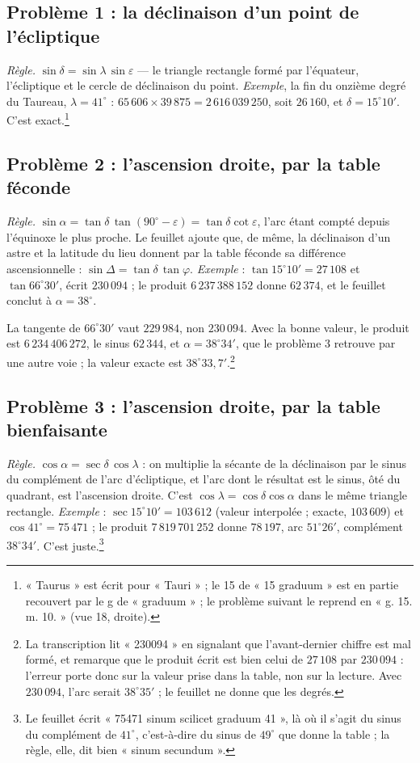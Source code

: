 \documentclass[11pt,a4paper]{article}
\begin{document}
\subsection*{Problème 1 : la déclinaison d'un point de l'écliptique}

\emph{Règle.} $\sin\delta = \sin\lambda\,\sin\varepsilon$ — le triangle rectangle
formé par l'équateur, l'écliptique et le cercle de déclinaison du point.
\emph{Exemple}, la fin du onzième degré du Taureau, $\lambda = 41^\circ$ :
$65\,606 \times 39\,875 = 2\,616\,039\,250$, soit $26\,160$, et $\delta =
15^\circ 10'$. C'est exact.\footnote{« Taurus » est écrit pour « Tauri » ; le 15 de
« 15 graduum » est en partie recouvert par le g de « graduum » ; le problème
suivant le reprend en « g. 15. m. 10. » (vue 18, droite).}

\subsection*{Problème 2 : l'ascension droite, par la table féconde}

\emph{Règle.} $\sin\alpha = \tan\delta\,\tan(90^\circ-\varepsilon) =
\tan\delta\cot\varepsilon$, l'arc étant compté depuis l'équinoxe le plus proche.
Le feuillet ajoute que, de même, la déclinaison d'un astre et la latitude du lieu
donnent par la table féconde sa différence ascensionnelle :
$\sin\Delta = \tan\delta\,\tan\varphi$. \emph{Exemple} : $\tan 15^\circ 10' =
27\,108$ et $\tan 66^\circ 30'$, écrit $230\,094$ ; le produit $6\,237\,388\,152$
donne $62\,374$, et le feuillet conclut à $\alpha = 38^\circ$.

La tangente de $66^\circ 30'$ vaut $229\,984$, non $230\,094$. Avec la bonne
valeur, le produit est $6\,234\,406\,272$, le sinus $62\,344$, et
$\alpha = 38^\circ 34'$, que le problème 3 retrouve par une autre voie ; la valeur
exacte est $38^\circ 33{,}7'$.\footnote{La transcription lit « 230094 » en
signalant que l'avant-dernier chiffre est mal formé, et remarque que le produit
écrit est bien celui de $27\,108$ par $230\,094$ : l'erreur porte donc sur la
valeur prise dans la table, non sur la lecture. Avec $230\,094$, l'arc serait
$38^\circ 35'$ ; le feuillet ne donne que les degrés.}

\subsection*{Problème 3 : l'ascension droite, par la table bienfaisante}

\emph{Règle.} $\cos\alpha = \sec\delta\,\cos\lambda$ : on multiplie la sécante de
la déclinaison par le sinus du complément de l'arc d'écliptique, et l'arc dont le
résultat est le sinus, ôté du quadrant, est l'ascension droite. C'est
$\cos\lambda = \cos\delta\cos\alpha$ dans le même triangle rectangle.
\emph{Exemple} : $\sec 15^\circ 10' = 103\,612$ (valeur interpolée ; exacte,
$103\,609$) et $\cos 41^\circ = 75\,471$ ; le produit $7\,819\,701\,252$ donne
$78\,197$, arc $51^\circ 26'$, complément $38^\circ 34'$. C'est
juste.\footnote{Le feuillet écrit « 75471 sinum scilicet graduum 41 », là où il
s'agit du sinus du complément de $41^\circ$, c'est-à-dire du sinus de $49^\circ$
que donne la table ; la règle, elle, dit bien « sinum secundum ».}
\end{document}
